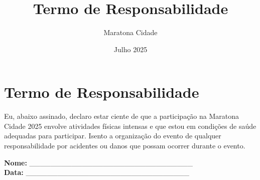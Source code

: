 \documentclass[a4paper,12pt]{article}
\begin{document}
\title{Termo de Responsabilidade}
\author{Maratona Cidade}
\date{Julho 2025}
\maketitle

\section*{Termo de Responsabilidade}

Eu, abaixo assinado, declaro estar ciente de que a participação na Maratona Cidade 2025 envolve atividades físicas intensas e que estou em condições de saúde adequadas para participar. Isento a organização do evento de qualquer responsabilidade por acidentes ou danos que possam ocorrer durante o evento.

\vspace{1cm}

\textbf{Nome:} _______________________________ \\
\textbf{Data:} _______________________________
\end{document}
